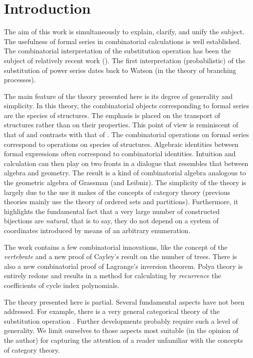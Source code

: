 \documentclass{amsart}
\theoremstyle{definition}
\theoremstyle{remark}
\newcommand{\term}[1]{\emph{#1}}
\begin{document}
\section{Introduction}
\label{sec:introduction}

The aim of this work is simultaneously to explain, clarify, and unify
the subject.  The usefulness of formal series in combinatorial
calculations is well established.  The combinatorial interpretation of
the substitution operation has been the subject of relatively recent
work (\citet{bender1971enumerative, doubilet1975generating,
  foata1970theorie, garsia1976lecture, gessel1977generating}). The
first interpretation (probabilistic) of the substitution of power
series dates back to Watson \citep{kendall1966branching} (in the
theory of branching processes).

The main feature of the theory presented here is its degree of
generality and simplicity. In this theory, the combinatorial objects
corresponding to formal series are the species of structures. The
emphasis is placed on the transport of structures rather than on their
properties. This point of view is reminiscent of that of
\citet{ehresmann1965categories} and contrasts with that of
\citet{bourbaki1968elements}. The combinatorial operations on formal
series correspond to operations on species of structures. Algebraic
identities between formal expressions often correspond to
combinatorial identities.  Intuition and calculation can then play on
two fronts in a dialogue that resembles that between algebra and
geometry. The result is a kind of combinatorial algebra analogous to
the geometric algebra of Grassman (and Leibniz). The simplicity of the
theory is largely due to the use it makes of the concepts of category
theory \citep{mac1971categories} (previous theories mainly use the
theory of ordered sets and partitions). Furthermore, it highlights the
fundamental fact that a very large number of constructed bijections
are \emph{natural}, that is to say, they do not depend on a system of
coordinates introduced by means of an arbitrary enumeration.

The work contains a few combinatorial innovations, like the concept of
the \term{vertebrate} and a new proof of Cayley's result on the number
of trees. There is also a new combinatorial proof of Lagrange's
inversion theorem. Polya theory is entirely redone and results in a
method for calculating by \emph{recurrence} the coefficients of cycle
index polynomials.

The theory presented here is partial. Several fundamental aspects have
not been addressed. For example, there is a very general categorical
theory of the substitution operation \citep{kelly1974clubs}. Further
developments probably require such a level of generality. We limit
ourselves to those aspects most suitable (in the opinion of the
author) for capturing the attention of a reader unfamiliar with the
concepts of category theory.
\end{document}
